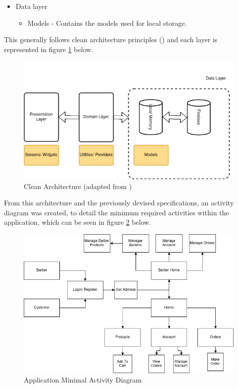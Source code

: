 \documentclass[12pt]{article}
\begin{document}
	\begin{itemize}
		\item Data layer
		\begin{itemize}
			\item Models - Contains the models used for local storage.
		\end{itemize}
	\end{itemize}

	 This generally follows clean architecture principles (\cite{martinRapidApplicationDevelopment1991}) and each layer is represented in figure \ref{fig:clean-architecture} below.
	 
	 \begin{figure}[H]
	 	\centering
	 	\includegraphics[scale=0.7]{images/clean-architecture.png}
	 	\caption{Clean Architecture (adapted from \cite{martinRapidApplicationDevelopment1991})}
	 	\label{fig:clean-architecture}
	 \end{figure}
 
 	From this architecture and the previously devised specifications, an activity diagram was created, to detail the minimum required activities within the application, which can be seen in figure \ref{fig:activities} below.
 	
 	
 	\begin{figure}[H]
 		\centering
 		\includegraphics[scale=0.6]{images/activities.png}
 		\caption{Application Minimal Activity Diagram}
 		\label{fig:activities}
 	\end{figure}
	 
\end{document}

